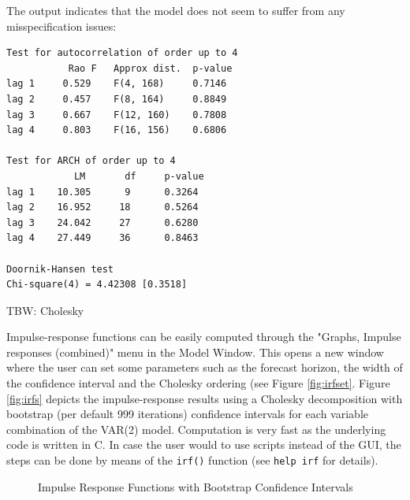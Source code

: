 \documentclass[11pt]{article}
\newcommand{\remph}[1]{{\color{myred}#1}}
\begin{document}
The output indicates that the model does not seem to suffer from any misspecification issues:
\begin{Verbatim}[baselinestretch=0.75, fontsize=\small]
Test for autocorrelation of order up to 4
           Rao F   Approx dist.  p-value
lag 1     0.529    F(4, 168)     0.7146
lag 2     0.457    F(8, 164)     0.8849
lag 3     0.667    F(12, 160)    0.7808
lag 4     0.803    F(16, 156)    0.6806

Test for ARCH of order up to 4
            LM       df     p-value
lag 1    10.305      9      0.3264
lag 2    16.952     18      0.5264
lag 3    24.042     27      0.6280
lag 4    27.449     36      0.8463

Doornik-Hansen test
Chi-square(4) = 4.42308 [0.3518]

\end{Verbatim}


\remph{TBW: Cholesky}

Impulse-response functions can be easily computed through the "Graphs, Impulse responses (combined)" menu in the Model Window. This opens a new window where the user can set some parameters such as the forecast horizon, the width of the confidence interval and the Cholesky ordering (see Figure \ref{fig:irfset}.
Figure \ref{fig:irfs} depicts the impulse-response results using a Cholesky decomposition with bootstrap (per default 999 iterations) confidence intervals for each variable combination of the VAR(2) model. Computation is very fast as the underlying code is written in C. In case the user would to use scripts instead of the GUI, the steps can be done by means of the \texttt{irf()} function (see \texttt{help irf} for details).

\begin{figure}[h!]
	\centering
	\caption{Impulse Response Functions with Bootstrap Confidence Intervals}
	\label{fig:IRF}
\end{figure}
\end{document}
